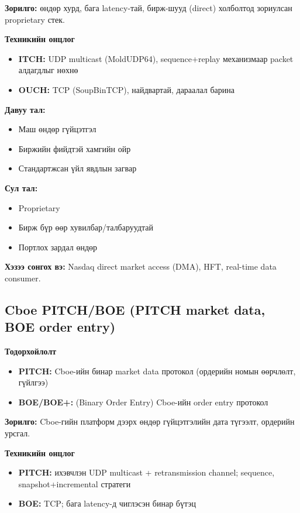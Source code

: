 \textbf{Зорилго:} өндөр хурд, бага latency-тай, бирж-шууд (direct) холболтод зориулсан proprietary стек.

\textbf{Техникийн онцлог}
\begin{itemize}
    \item \textbf{ITCH:} UDP multicast (MoldUDP64), sequence+replay механизмаар packet алдагдлыг нөхнө
    \item \textbf{OUCH:} TCP (SoupBinTCP), найдвартай, дараалал барина
\end{itemize}

{\textbf{Давуу тал:}}
\begin{itemize}
    \item Маш өндөр гүйцэтгэл
    \item Биржийн фийдтэй хамгийн ойр
    \item Стандартжсан үйл явдлын загвар
\end{itemize}

{\textbf{Сул тал:}}
\begin{itemize}
    \item Proprietary
    \item Бирж бүр өөр хувилбар/талбаруудтай
    \item Портлох зардал өндөр
\end{itemize}

\textbf{Хэзээ сонгох вэ:} Nasdaq direct market access (DMA), HFT, real-time data consumer.

\subsection{Cboe PITCH/BOE (PITCH market data, BOE order entry)}

\textbf{Тодорхойлолт}
\begin{itemize}
    \item \textbf{PITCH:} Cboe-ийн бинар market data протокол (ордерийн номын өөрчлөлт, гүйлгээ)
    \item \textbf{BOE/BOE+:} (Binary Order Entry) Cboe-ийн order entry протокол
\end{itemize}

\textbf{Зорилго:} Cboe-гийн платформ дээрх өндөр гүйцэтгэлийн дата түгээлт, ордерийн урсгал.

\textbf{Техникийн онцлог}
\begin{itemize}
    \item \textbf{PITCH:} ихэвчлэн UDP multicast + retransmission channel; sequence, snapshot+incremental стратеги
    \item \textbf{BOE:} TCP; бага latency-д чиглэсэн бинар бүтэц
\end{itemize}


